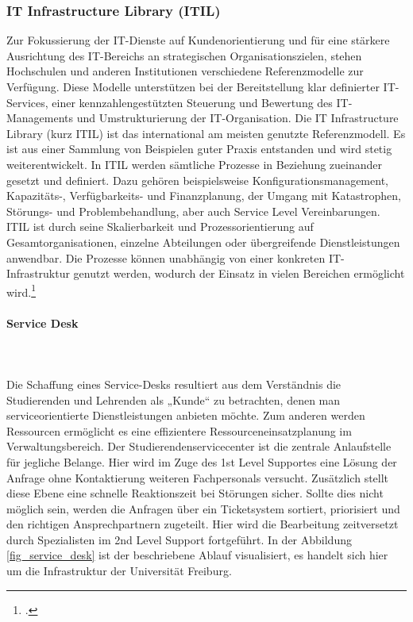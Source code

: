 \subsubsection{IT Infrastructure Library (ITIL)}
Zur Fokussierung der IT-Dienste auf Kundenorientierung und für eine stärkere Ausrichtung des IT-Bereichs an strategischen Organisationszielen, stehen Hochschulen und anderen Institutionen verschiedene Referenzmodelle zur Verfügung. Diese Modelle unterstützen bei der Bereitstellung klar definierter IT-Services, einer kennzahlengestützten Steuerung und Bewertung des IT-Managements und Umstrukturierung der IT-Organisation. Die IT Infrastructure Library (kurz ITIL) ist das international am meisten genutzte Referenzmodell. Es ist aus einer Sammlung von Beispielen guter Praxis entstanden und wird stetig weiterentwickelt. In ITIL werden sämtliche Prozesse in Beziehung zueinander gesetzt und definiert. Dazu gehören beispielsweise Konfigurationsmanagement, Kapazitäts-, Verfügbarkeits- und Finanzplanung, der Umgang mit Katastrophen, Störungs- und Problembehandlung, aber auch Service Level Vereinbarungen. ITIL ist durch seine Skalierbarkeit und Prozessorientierung auf Gesamtorganisationen, einzelne Abteilungen oder übergreifende Dienstleistungen anwendbar. Die Prozesse können unabhängig von einer konkreten IT-Infrastruktur genutzt werden, wodurch der Einsatz in vielen Bereichen ermöglicht wird.\footcite{Zitat fehlt}

\paragraph{Service Desk}\mbox{}\\\\	
Die Schaffung eines Service-Desks resultiert aus dem Verständnis die Studierenden und Lehrenden als „Kunde“ zu betrachten, denen man serviceorientierte Dienstleistungen anbieten möchte. Zum anderen werden Ressourcen ermöglicht es eine effizientere Ressourceneinsatzplanung im Verwaltungsbereich. Der Studierendenservicecenter ist die zentrale Anlaufstelle für jegliche Belange. Hier wird im Zuge des 1st Level Supportes eine Lösung der Anfrage ohne Kontaktierung weiteren Fachpersonals versucht. Zusätzlich stellt diese Ebene eine schnelle Reaktionszeit bei Störungen sicher. Sollte dies nicht möglich sein, werden die Anfragen über ein Ticketsystem sortiert, priorisiert und den richtigen Ansprechpartnern zugeteilt. Hier wird die Bearbeitung zeitversetzt durch Spezialisten im 2nd Level Support fortgeführt. In der Abbildung \ref{fig_service_desk} ist der beschriebene Ablauf visualisiert, es handelt sich hier um die Infrastruktur der Universität Freiburg.
 
